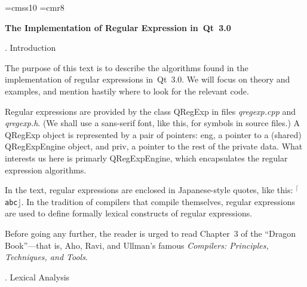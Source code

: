 


\font\sf=cmss10
\font\eightrm=cmr8

\def\rx#1{{$^{\scriptscriptstyle\lceil}$\tt#1$\scriptscriptstyle\rfloor$}}

\def\<#1>{\leavevmode\hbox{$\langle$#1\/$\rangle$}}
\def\tok#1{\leavevmode\hbox{\eightrm\uppercase{#1}}}
\def\\{\char`\\}
\def\^{\char`\^}
\def\lex#1{\leavevmode\hbox{\tt#1}}
\let\is=\longrightarrow
\let\alt=\mid

\def\f#1{\strut\enskip#1\hfil\enskip}
\def\g#1{\strut\enskip\hfil#1\hfil\enskip}
\def\x{\phantom{+}}
\def\haha{$\hat a$}

\centerline{\bf The Implementation of Regular Expression in~Qt~3.0}
\smallskip

. Introduction

The purpose of this text is to describe the algorithms found in the implementation of regular expressions in~Qt~3.0.  We will focus on theory and examples, and mention hastily where to look for the relevant code.

Regular expressions are provided by the class {\sf QRegExp} in files {\it qregexp.cpp} and {\it qregexp.h}.  (We shall use a sans-serif font, {\sf like this}, for symbols in source files.)  A {\sf QRegExp} object is represented by a pair of pointers:  {\sf eng}, a pointer to a (shared) {\sf QRegExpEngine} object, and {\sf priv}, a pointer to the rest of the private data.  What interests us here is primarly {\sf QRegExpEngine}, which encapsulates the regular expression algorithms.

In the text, regular expressions are enclosed in Japanese-style quotes, like this: \rx{abc}.  In the tradition of compilers that compile themselves, regular expressions are used to define formally lexical constructs of regular expressions.

Before going any further, the reader is urged to read Chapter~3 of the ``Dragon Book''---that is, Aho, Ravi, and Ullman's famous {\sl Compilers: Principles, Techniques, and Tools}.

. Lexical Analysis

